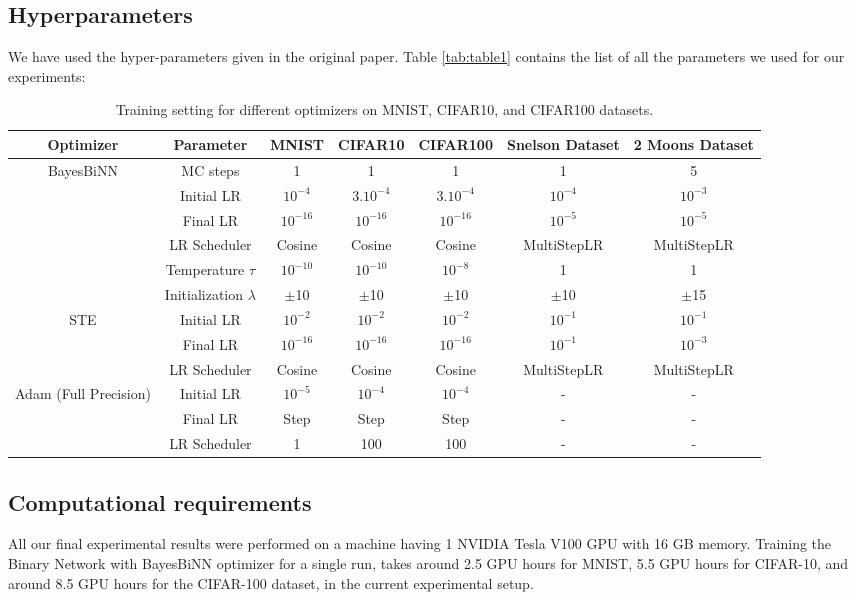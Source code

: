\subsection{Hyperparameters}
We have used the hyper-parameters given in the original paper. Table \autoref{tab:table1} contains the list of all the parameters we used for our experiments:

\begin{table}[h]
\begin{center}
\begin{tabular}{ | c | c | c | c | c | c | c | }
\hline
  Optimizer & Parameter & MNIST & CIFAR10 & CIFAR100 & Snelson Dataset & 2 Moons Dataset \\ \hline
  \multirow{6}{5em}{BayesBiNN} & MC steps & 1 & 1 & 1 & 1 & 5 \\
   & Initial LR & $10^{-4}$ & $3.10^{-4}$ & $3.10^{-4}$ & $10^{-4}$ & $10^{-3}$ \\
   & Final LR & $10^{-16}$ & $10^{-16}$ & $10^{-16}$ & $10^{-5}$ & $10^{-5}$ \\
   & LR Scheduler & Cosine & Cosine & Cosine & MultiStepLR & MultiStepLR \\
   & Temperature $\tau$ & $10^{-10}$ & $10^{-10}$ & $10^{-8}$ & 1 & 1 \\
   & Initialization $\lambda$ & $\pm$10 & $\pm$10 & $\pm$10 & $\pm$10 & $\pm$15 \\ \hline
      
  \multirow{3}{5em}{STE} 
   & Initial LR & $10^{-2}$ & $10^{-2}$ & $10^{-2}$ & $10^{-1}$ & $10^{-1}$ \\
   & Final LR & $10^{-16}$ & $10^{-16}$ & $10^{-16}$ & $10^{-1}$ & $10^{-3}$ \\
   & LR Scheduler & Cosine & Cosine & Cosine & MultiStepLR & MultiStepLR \\
\hline
   
  \multirow{3}{5em}{Adam (Full Precision)} 
   & Initial LR & $10^{-5}$ & $10^{-4}$ & $10^{-4}$ & - & - \\
   & Final LR & Step & Step & Step & - & - \\
   & LR Scheduler & 1 & 100 & 100 & - & - \\ \hline

\end{tabular}
\caption{Training setting for different optimizers on MNIST, CIFAR10, and CIFAR100 datasets.}
\label{tab:table1}
\end{center}
\end{table}


\subsection{Computational requirements}
All our final experimental results were performed on a machine having 1 NVIDIA Tesla V100 GPU with 16 GB memory. Training the Binary Network with BayesBiNN optimizer for a single run, takes around 2.5 GPU hours for MNIST, 5.5 GPU hours for CIFAR-10, and around 8.5 GPU hours for the CIFAR-100 dataset, in the current experimental setup.